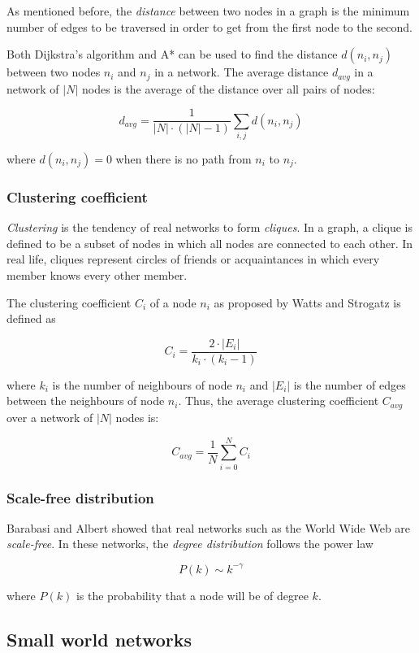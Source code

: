 \documentclass[a4paper,11pt,titlepage]{article}
\begin{document}
As mentioned before, the \emph{distance} between two nodes in a graph
is the minimum number of edges to be traversed in order to get from
the first node to the second.

Both Dijkstra's algorithm and A* can be used to find the distance
$d(n_i, n_j)$ between two nodes $n_i$ and $n_j$ in a network. The
average distance $d_{avg}$ in a network of $|N|$ nodes is the average
of the distance over all pairs of nodes:

\[ d_{avg} = \frac{1}{|N| \cdot (|N| - 1)} \sum_{i, j} d(n_i, n_j) \]

where $d(n_i, n_j) = 0$ when there is no path from $n_i$ to $n_j$.

\subsubsection{Clustering coefficient}
\label{sec:clusteringcoefficient}

\emph{Clustering} is the tendency of real networks to form
\emph{cliques}. In a graph, a clique is defined to be a subset of
nodes in which all nodes are connected to each other.
In real life, cliques represent circles of friends
or acquaintances in which every member knows every other member.

The clustering coefficient $C_i$ of a node $n_i$ as proposed by
Watts and Strogatz is defined as

\[ C_i = \frac{2 \cdot |E_i|}{k_i \cdot (k_i-1)} \]

where $k_i$ is the number of neighbours of node $n_i$ and $|E_i|$ is
the number of edges between the neighbours of node $n_i$. Thus, the
average clustering coefficient $C_{avg}$ over a network of $|N|$
nodes is:

\[ C_{avg} = \frac{1}{N}\sum_{i=0}^{N} C_i \]

\subsubsection{Scale-free distribution}
\label{sec:scale-free}

Barabasi and Albert showed that real networks such as the World Wide Web
are \emph{scale-free}. In these networks, the \emph{degree distribution}
follows the power law

\[ P(k) \sim k^{-\gamma} \]

where $P(k)$ is the probability that a node will be of degree $k$.


\subsection{Small world networks}
\end{document}
